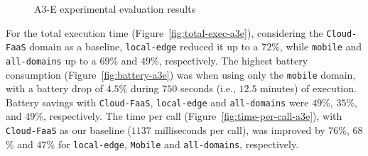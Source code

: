 \begin{figure}[htb]
	\centering
	\captionsetup[subfigure]{width=0.32\textwidth}	
		\captionsetup[subfigure]{width=0.32\textwidth}
	\captionsetup[subfigure]{width=0.32\textwidth}	
	\caption{A3-E experimental evaluation results} \label{fig:exp-a3e}
\end{figure}


For the total execution time (Figure~\ref{fig:total-exec-a3e}), considering the \texttt{Cloud-FaaS} domain as a baseline, \texttt{local-edge} reduced it up to a $72$\%, while \texttt{mobile} and \texttt{all-domains} up to a $69$\% and $49$\%, respectively. The highest battery consumption (Figure~\ref{fig:battery-a3e}) was when using only the \texttt{mobile} domain, with a battery drop of $4.5$\% during $750$ seconds (i.e., $12.5$ minutes) of execution. Battery savings with \texttt{Cloud-FaaS}, \texttt{local-edge} and \texttt{all-domains} were $49$\%, $35$\%, and $49$\%, respectively. The time per call (Figure~\ref{fig:time-per-call-a3e}), with \texttt{Cloud-FaaS} as our baseline ($1137$ milliseconds per call), was improved by $76$\%, $68$\% and $47$\% for \texttt{local-edge}, \texttt{Mobile} and \texttt{all-domains}, respectively. 

